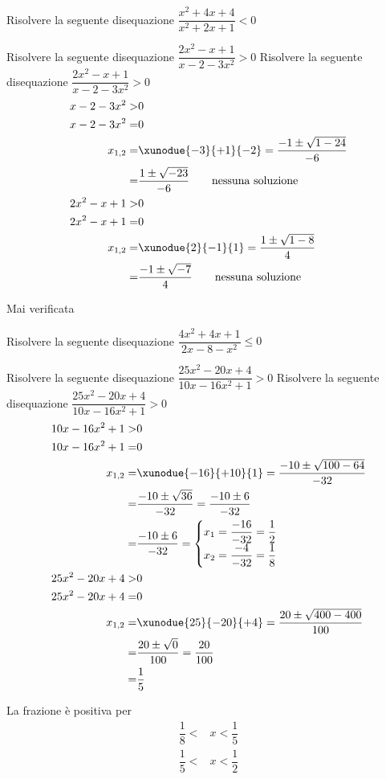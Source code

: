 \begin{exercise}[no solution]
		Risolvere la seguente disequazione $\dfrac{x^2+4x+4}{x^2+2x+1}< 0$
\end{exercise}
\begin{exercise}
		Risolvere la seguente disequazione $\dfrac{2x^2-x+1}{x-2-3x^2}> 0$
	\tcblower
		Risolvere la seguente disequazione $\dfrac{2x^2-x+1}{x-2-3x^2}> 0$
	\begin{align*}
	x-2-3x^2>&0\\
	x-2-3x^2=&0\\
	x_{1,2}=&\xunodue{-3}{+1}{-2}=\dfrac{-1\pm\sqrt{1-24}}{-6}\\
	=&\dfrac{1\pm\sqrt{-23}}{-6}
	\qquad\text{nessuna soluzione}\\
	2x^2-x+1>&0\\
	2x^2-x+1=&0\\
	x_{1,2}=&\xunodue{2}{-1}{1}=\dfrac{1\pm\sqrt{1-8}}{4}\\
	=&\dfrac{-1\pm\sqrt{-7}}{4}
	\qquad\text{nessuna soluzione}\\
	\end{align*}
	\begin{center}
		
	\end{center}
Mai verificata
\end{exercise}
\begin{exercise}[no solution]
		Risolvere la seguente disequazione $\dfrac{4x^2+4x+1}{2x-8-x^2}\leq 0$
\end{exercise}
\begin{exercise}
		Risolvere la seguente disequazione $\dfrac{25x^2-20x+4}{10x-16x^2+1}> 0$
		\tcblower
	Risolvere la seguente disequazione $\dfrac{25x^2-20x+4}{10x-16x^2+1}> 0$
\begin{align*}
10x-16x^2+1>&0\\
10x-16x^2+1=&0\\
x_{1,2}=&\xunodue{-16}{+10}{1}=\dfrac{-10\pm\sqrt{100-64}}{-32}\\
=&\dfrac{-10\pm\sqrt{36}}{-32}=\dfrac{-10\pm 6}{-32}\\
=&\dfrac{-10\pm 6}{-32}=\begin{cases}
x_1=\dfrac{-16}{-32}=\dfrac{1}{2}\\
x_2=\dfrac{-4}{-32}=\dfrac{1}{8}
\end{cases}\\
25x^2-20x+4>&0\\
25x^2-20x+4=&0\\
x_{1,2}=&\xunodue{25}{-20}{+4}=\dfrac{20\pm\sqrt{400-400}}{100}\\
=&\dfrac{20\pm\sqrt{0}}{100}=\dfrac{20}{100}\\
=&\dfrac{1}{5}\\
\end{align*}
	\begin{center}
	
\end{center}
La frazione è positiva per
\begin{align*}
\dfrac{1}{8}<&x<\dfrac{1}{5}\\ \dfrac{1}{5}<&x<\dfrac{1}{2}\\
\end{align*}
\end{exercise}
